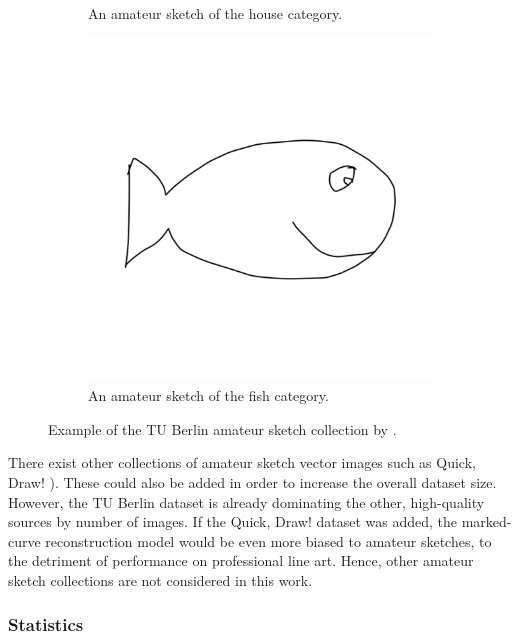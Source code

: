 \begin{figure}
\begin{subfigure}{.3\textwidth}
        \caption{An amateur sketch of the house category.}
    \end{subfigure}
    \begin{subfigure}{.3\textwidth}
        \includegraphics[width=\textwidth]{graphics/tuberlin/6561.pdf}
        \caption{An amateur sketch of the fish category.}
    \end{subfigure}
    \caption{Example of the TU Berlin amateur sketch collection by \citet{eitz2012hdhso}.}
    \label{fig:tuberlin.example}
\end{figure}

There exist other collections of amateur sketch vector images such as Quick, Draw! \citep{DBLP:conf/iclr/HaE18}). These could also be added in order to increase the overall dataset size. However, the TU Berlin dataset is already dominating the other, high-quality sources by number of images. If the Quick, Draw! dataset was added, the marked-curve reconstruction model would be even more biased to amateur sketches, to the detriment of performance on professional line art. Hence, other amateur sketch collections are not considered in this work.

\subsubsection{Statistics}
\label{subsec:dataset.stats}

